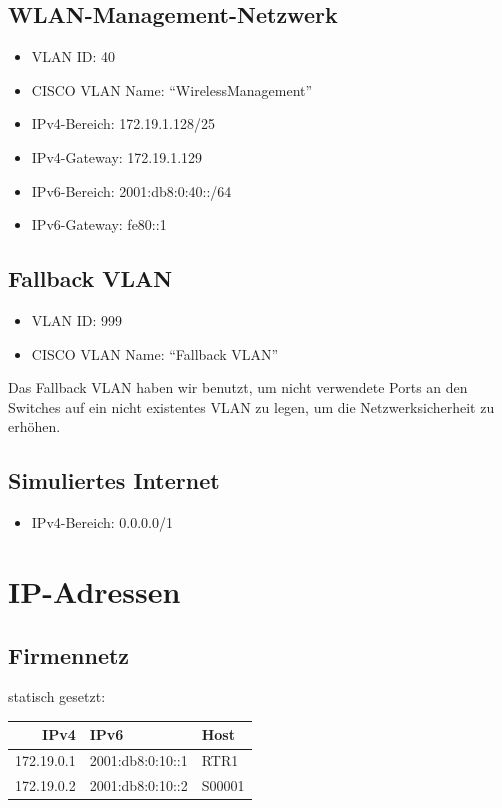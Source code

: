 \documentclass[11pt]{article}
\begin{document}
\subsection{WLAN-Management-Netzwerk}
\label{sec:org18809ec}
\begin{itemize}
\item VLAN ID: 40
\item CISCO VLAN Name: ``WirelessManagement''
\item IPv4-Bereich: 172.19.1.128/25
\item IPv4-Gateway: 172.19.1.129
\item IPv6-Bereich: 2001:db8:0:40::/64
\item IPv6-Gateway: fe80::1
\end{itemize}
\subsection{Fallback VLAN}
\label{sec:org4fcf414}
\begin{itemize}
\item VLAN ID: 999
\item CISCO VLAN Name: ``Fallback VLAN''
\end{itemize}

Das Fallback VLAN haben wir benutzt, um nicht verwendete Ports an den Switches auf ein nicht existentes VLAN zu legen, um die Netzwerksicherheit zu erhöhen.
\subsection{Simuliertes Internet}
\label{sec:orge35439e}
\begin{itemize}
\item IPv4-Bereich: 0.0.0.0/1
\end{itemize}
\section{IP-Adressen}
\label{sec:org315c527}
\subsection{Firmennetz}
\label{sec:orgab5f020}
statisch gesetzt:

\begin{center}
\begin{tabular}{rll}
IPv4 & IPv6 & Host\\
\hline
172.19.0.1 & 2001:db8:0:10::1 & RTR1\\
172.19.0.2 & 2001:db8:0:10::2 & S00001\\
\end{tabular}
\end{center}
\end{document}
